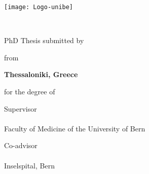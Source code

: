 
\begin{titlepage}
	
	\hfill{\texttt{[image: Logo-unibe]}}
	
	\begin{center}
		
		\vspace*{0.5cm}
		{\Large \facname \\ \textsc{\univname} \par}\vspace{1cm} %
		
		{\huge \bfseries \ttitle\par}\vspace{1cm} %
		
		
		\large{PhD Thesis submitted by}\vspace{0.5cm}
		
		{\Large \bfseries \authorname \par}\vspace{0.5cm}
		
		
		\large{from }{\Large \bfseries Thessaloniki, Greece \par}\vspace{0.5cm}
		
		\large{for } the degree of \degreename \vspace{0.5cm}
		
		\vfill
		
		\large{Supervisor \\ \supname \\ Faculty of Medicine of the University of Bern}\vspace{0.5cm}
		
		\large{Co-advisor \\ \examname \\ Inselspital, Bern}\vspace{0.5cm}
		
	\end{center}
\end{titlepage}
\cleardoublepage

